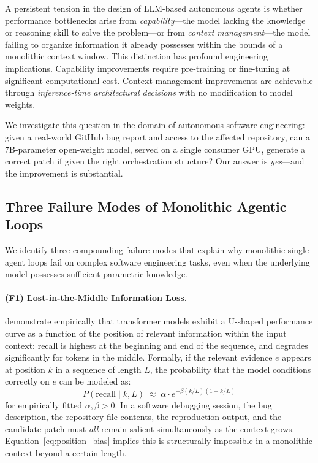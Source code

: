 \documentclass[letterpaper]{aaai25}  %
\begin{document}
A persistent tension in the design of LLM-based autonomous agents is
whether performance bottlenecks arise from \emph{capability}---the model
lacking the knowledge or reasoning skill to solve the problem---or from
\emph{context management}---the model failing to organize information it
already possesses within the bounds of a monolithic context window. This
distinction has profound engineering implications. Capability improvements
require pre-training or fine-tuning at significant computational cost.
Context management improvements are achievable through \emph{inference-time
architectural decisions} with no modification to model weights.

We investigate this question in the domain of autonomous software
engineering: given a real-world GitHub bug report and access to the affected
repository, can a 7B-parameter open-weight model, served on a single
consumer GPU, generate a correct patch if given the right orchestration
structure? Our answer is \emph{yes}---and the improvement is substantial.

\subsection{Three Failure Modes of Monolithic Agentic Loops}
\label{sec:intro:failures}

We identify three compounding failure modes that explain why monolithic
single-agent loops fail on complex software engineering tasks, even when the
underlying model possesses sufficient parametric knowledge.

\paragraph{(F1) Lost-in-the-Middle Information Loss.}
\citet{liu2023lostmiddle} demonstrate empirically that transformer models
exhibit a U-shaped performance curve as a function of the position of
relevant information within the input context: recall is highest at the
beginning and end of the sequence, and degrades significantly for tokens
in the middle. Formally, if the relevant evidence $e$ appears at position
$k$ in a sequence of length $L$, the probability that the model
conditions correctly on $e$ can be modeled as:
\begin{equation}
  P(\text{recall} \mid k, L) \;\approx\; \alpha \cdot e^{-\beta(k/L)(1 - k/L)}
  \label{eq:position_bias}
\end{equation}
for empirically fitted $\alpha, \beta > 0$. In a software debugging session,
the bug description, the repository file contents, the reproduction output,
and the candidate patch must \emph{all} remain salient simultaneously as the
context grows. Equation~\eqref{eq:position_bias} implies this is
structurally impossible in a monolithic context beyond a certain length.
\end{document}
